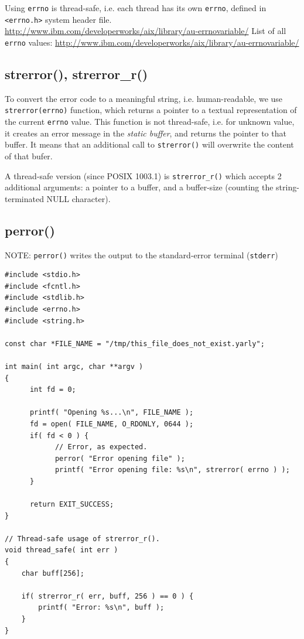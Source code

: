 Using \verb!errno! is thread-safe, i.e. each thread has its own \verb!errno!,
defined in \verb!<errno.h>! system header file.
\url{http://www.ibm.com/developerworks/aix/library/au-errnovariable/}
List of all \verb!errno! values:
\url{http://www.ibm.com/developerworks/aix/library/au-errnovariable/} 

\subsection{strerror(), strerror\_r()}
\label{sec:strerror()}
\label{sec:strerror_r()}

To convert the error code to a meaningful string, i.e. human-readable, we use
\verb!strerror(errno)! function, which returns a pointer to a textual
representation of the current \verb!errno! value. This function is not
thread-safe, i.e. for unknown value, it creates an error message in the {\it
static buffer}, and returns the pointer to that buffer. It means that an
additional call to \verb!strerror()! will overwrite the content of that bufer. 

A thread-safe version (since POSIX 1003.1) is \verb!strerror_r()! which accepts
2 additional arguments: a pointer to a buffer, and a buffer-size (counting the
string-terminated NULL character).

\subsection{perror()}
\label{sec:perror()}

NOTE: \verb!perror()! writes the output to the standard-error terminal
(\verb!stderr!)

\begin{lstlisting}
#include <stdio.h>
#include <fcntl.h>
#include <stdlib.h>
#include <errno.h>
#include <string.h>

const char *FILE_NAME = "/tmp/this_file_does_not_exist.yarly";

int main( int argc, char **argv )
{
      int fd = 0;

      printf( "Opening %s...\n", FILE_NAME );	
      fd = open( FILE_NAME, O_RDONLY, 0644 );
      if( fd < 0 ) {
            // Error, as expected.
            perror( "Error opening file" );
            printf( "Error opening file: %s\n", strerror( errno ) );
      }

      return EXIT_SUCCESS;
}

// Thread-safe usage of strerror_r().
void thread_safe( int err )
{
    char buff[256];
    
    if( strerror_r( err, buff, 256 ) == 0 ) {
        printf( "Error: %s\n", buff );
    }
}
\end{lstlisting}


